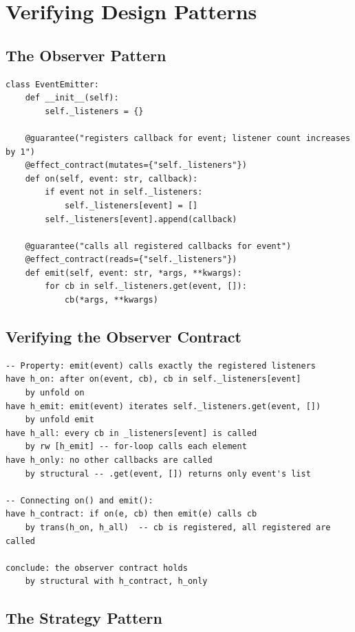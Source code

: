 \documentclass[11pt,a4paper]{report}
\theoremstyle{definition}
\theoremstyle{plain}
\begin{document}
\chapter{Verifying Design Patterns}
\label{ch:case-patterns}

\section{The Observer Pattern}

\begin{lstlisting}[style=synhopy]
class EventEmitter:
    def __init__(self):
        self._listeners = {}

    @guarantee("registers callback for event; listener count increases by 1")
    @effect_contract(mutates={"self._listeners"})
    def on(self, event: str, callback):
        if event not in self._listeners:
            self._listeners[event] = []
        self._listeners[event].append(callback)

    @guarantee("calls all registered callbacks for event")
    @effect_contract(reads={"self._listeners"})
    def emit(self, event: str, *args, **kwargs):
        for cb in self._listeners.get(event, []):
            cb(*args, **kwargs)
\end{lstlisting}

\section{Verifying the Observer Contract}

\begin{lstlisting}[style=proof]
-- Property: emit(event) calls exactly the registered listeners
have h_on: after on(event, cb), cb in self._listeners[event]
    by unfold on
have h_emit: emit(event) iterates self._listeners.get(event, [])
    by unfold emit
have h_all: every cb in _listeners[event] is called
    by rw [h_emit] -- for-loop calls each element
have h_only: no other callbacks are called
    by structural -- .get(event, []) returns only event's list

-- Connecting on() and emit():
have h_contract: if on(e, cb) then emit(e) calls cb
    by trans(h_on, h_all)  -- cb is registered, all registered are called

conclude: the observer contract holds
    by structural with h_contract, h_only
\end{lstlisting}

\section{The Strategy Pattern}
\end{document}
